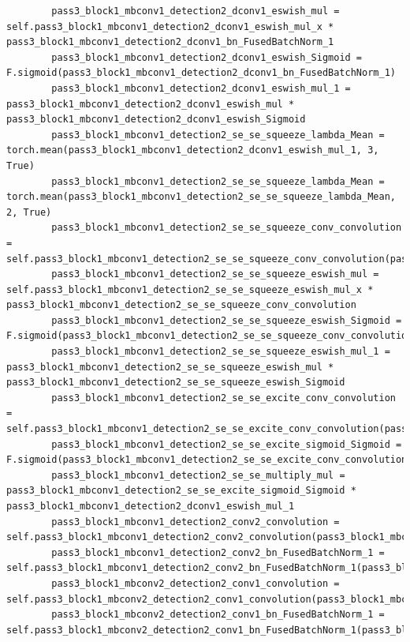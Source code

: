 \documentclass{fisatprojectfinal}
\begin{document}
\begin{appendices}
\begin{lstlisting}
        pass3_block1_mbconv1_detection2_dconv1_eswish_mul = self.pass3_block1_mbconv1_detection2_dconv1_eswish_mul_x * pass3_block1_mbconv1_detection2_dconv1_bn_FusedBatchNorm_1
        pass3_block1_mbconv1_detection2_dconv1_eswish_Sigmoid = F.sigmoid(pass3_block1_mbconv1_detection2_dconv1_bn_FusedBatchNorm_1)
        pass3_block1_mbconv1_detection2_dconv1_eswish_mul_1 = pass3_block1_mbconv1_detection2_dconv1_eswish_mul * pass3_block1_mbconv1_detection2_dconv1_eswish_Sigmoid
        pass3_block1_mbconv1_detection2_se_se_squeeze_lambda_Mean = torch.mean(pass3_block1_mbconv1_detection2_dconv1_eswish_mul_1, 3, True)
        pass3_block1_mbconv1_detection2_se_se_squeeze_lambda_Mean = torch.mean(pass3_block1_mbconv1_detection2_se_se_squeeze_lambda_Mean, 2, True)
        pass3_block1_mbconv1_detection2_se_se_squeeze_conv_convolution = self.pass3_block1_mbconv1_detection2_se_se_squeeze_conv_convolution(pass3_block1_mbconv1_detection2_se_se_squeeze_lambda_Mean)
        pass3_block1_mbconv1_detection2_se_se_squeeze_eswish_mul = self.pass3_block1_mbconv1_detection2_se_se_squeeze_eswish_mul_x * pass3_block1_mbconv1_detection2_se_se_squeeze_conv_convolution
        pass3_block1_mbconv1_detection2_se_se_squeeze_eswish_Sigmoid = F.sigmoid(pass3_block1_mbconv1_detection2_se_se_squeeze_conv_convolution)
        pass3_block1_mbconv1_detection2_se_se_squeeze_eswish_mul_1 = pass3_block1_mbconv1_detection2_se_se_squeeze_eswish_mul * pass3_block1_mbconv1_detection2_se_se_squeeze_eswish_Sigmoid
        pass3_block1_mbconv1_detection2_se_se_excite_conv_convolution = self.pass3_block1_mbconv1_detection2_se_se_excite_conv_convolution(pass3_block1_mbconv1_detection2_se_se_squeeze_eswish_mul_1)
        pass3_block1_mbconv1_detection2_se_se_excite_sigmoid_Sigmoid = F.sigmoid(pass3_block1_mbconv1_detection2_se_se_excite_conv_convolution)
        pass3_block1_mbconv1_detection2_se_se_multiply_mul = pass3_block1_mbconv1_detection2_se_se_excite_sigmoid_Sigmoid * pass3_block1_mbconv1_detection2_dconv1_eswish_mul_1
        pass3_block1_mbconv1_detection2_conv2_convolution = self.pass3_block1_mbconv1_detection2_conv2_convolution(pass3_block1_mbconv1_detection2_se_se_multiply_mul)
        pass3_block1_mbconv1_detection2_conv2_bn_FusedBatchNorm_1 = self.pass3_block1_mbconv1_detection2_conv2_bn_FusedBatchNorm_1(pass3_block1_mbconv1_detection2_conv2_convolution)
        pass3_block1_mbconv2_detection2_conv1_convolution = self.pass3_block1_mbconv2_detection2_conv1_convolution(pass3_block1_mbconv1_detection2_conv2_bn_FusedBatchNorm_1)
        pass3_block1_mbconv2_detection2_conv1_bn_FusedBatchNorm_1 = self.pass3_block1_mbconv2_detection2_conv1_bn_FusedBatchNorm_1(pass3_block1_mbconv2_detection2_conv1_convolution)

\end{lstlisting}
\end{appendices}
\end{document}
